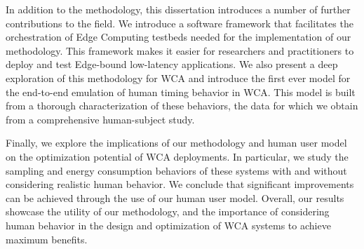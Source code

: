 In addition to the methodology, this dissertation introduces a number of further contributions to the field. 
We introduce a software framework that facilitates the orchestration of Edge Computing testbeds needed for the implementation of our methodology.
This framework makes it easier for researchers and practitioners to deploy and test Edge-bound low-latency applications.
We also present a deep exploration of this methodology for \gls{WCA} and introduce the first ever model for the end-to-end emulation of human timing behavior in \gls{WCA}.
This model is built from a thorough characterization of these behaviors, the data for which we obtain from a comprehensive human-subject study.

Finally, we explore the implications of our methodology and human user model on the optimization potential of \gls{WCA} deployments.
In particular, we study the sampling and energy consumption behaviors of these systems with and without considering realistic human behavior.
We conclude that significant improvements can be achieved through the use of our human user model.
Overall, our results showcase the utility of our methodology, and the importance of considering human behavior in the design and optimization of \gls{WCA} systems to achieve maximum benefits.
